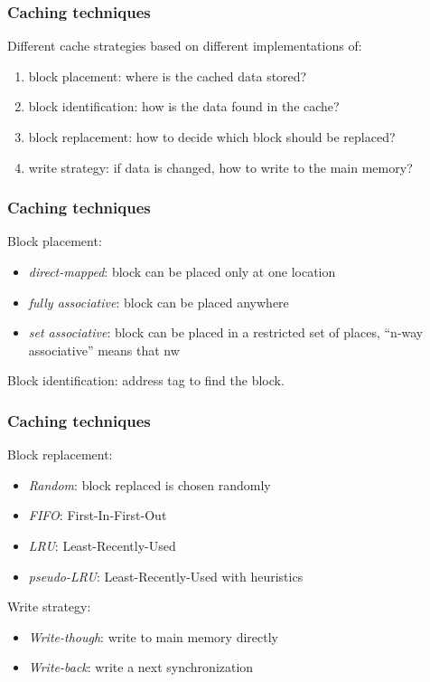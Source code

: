 \begin{frame}
  \frametitle{Caching techniques}
\medskip
Different cache strategies based on different implementations of:
\begin{enumerate}
\item block placement: where is the cached data stored?
\item block identification: how is the data found in the cache?
\item block replacement: how to decide which block should be replaced?
\item write strategy: if data is changed, how to write to the main memory?
\end{enumerate}
\end{frame}

\begin{frame}
  \frametitle{Caching techniques}

Block placement:
\begin{itemize}
\item \textit{direct-mapped}: block can be placed only at one location
\item \textit{fully associative}: block can be placed anywhere
\item \textit{set associative}: block can be placed in a restricted set of places, ``n-way associative'' means that nw
\end{itemize}

\medskip
Block identification: address tag to find the block. 


\end{frame}

\begin{frame}
  \frametitle{Caching techniques}

Block replacement:
\begin{itemize}
\item \textit{Random}: block replaced is chosen randomly
\item \textit{FIFO}: First-In-First-Out
\item \textit{LRU}: Least-Recently-Used
\item \textit{pseudo-LRU}: Least-Recently-Used with heuristics
\end{itemize}

Write strategy:
\begin{itemize}
\item \textit{Write-though}: write to main memory directly
\item \textit{Write-back}: write a next synchronization
\end{itemize}
\end{frame}


